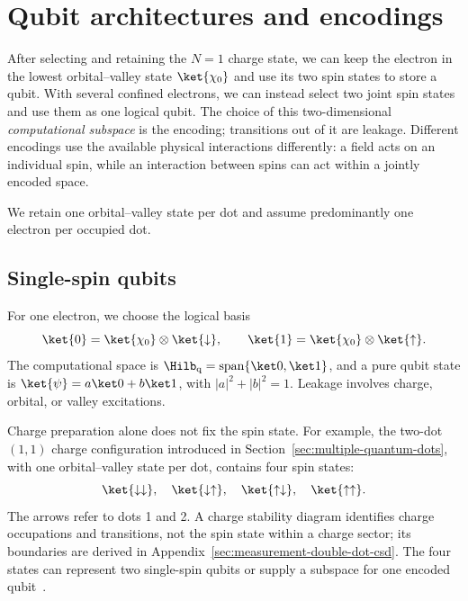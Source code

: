 \FloatBarrier
\section{Qubit architectures and encodings}
\label{sec:qubit-architectures}

After selecting and retaining the $N=1$ charge state, we can keep
the electron in the lowest orbital--valley state $\ket{\chi_0}$ and
use its two spin states to store a qubit. With several confined
electrons, we can instead select two joint spin states and use them
as one logical qubit. The choice of this two-dimensional
\emph{computational subspace} is the encoding; transitions out of
it are leakage. Different encodings use the available physical
interactions differently: a field acts on an individual spin,
while an interaction between spins can act within a jointly
encoded space.

We retain one orbital--valley state per dot and assume predominantly
one electron per occupied dot.

\subsection{Single-spin qubits}
\label{sec:single-spin-qubits}

For one electron, we choose the logical basis
\begin{equation}
  \ket{0}=\ket{\chi_0}\otimes\ket{\downarrow},
  \qquad
  \ket{1}=\ket{\chi_0}\otimes\ket{\uparrow}.
  \label{eq:qubit-basis}
\end{equation}
The computational space is
$\Hilb_{\mathrm q}=\operatorname{span}\{\ket0,\ket1\}$,
and a pure qubit state is $\ket{\psi}=a\ket0+b\ket1$, with
$|a|^2+|b|^2=1$.
Leakage involves charge, orbital, or valley excitations.

Charge preparation alone does not fix the spin state.
For example, the two-dot $(1,1)$ charge configuration introduced
in Section~\ref{sec:multiple-quantum-dots}, with one orbital--valley
state per dot, contains four spin states:
\begin{equation}
  \ket{\downarrow\downarrow},\quad
  \ket{\downarrow\uparrow},\quad
  \ket{\uparrow\downarrow},\quad
  \ket{\uparrow\uparrow}.
  \label{eq:two-spin-basis}
\end{equation}
The arrows refer to dots 1 and 2. A charge stability diagram identifies
charge occupations and transitions, not the spin state within a charge
sector; its boundaries are derived in
Appendix~\ref{sec:measurement-double-dot-csd}.
The four states can represent two single-spin qubits or supply
a subspace for one encoded qubit~\cite{Burkard2023}.

